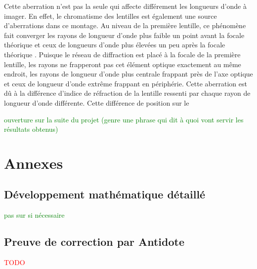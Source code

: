 \documentclass[conference]{IEEEtran}
\begin{document}
Cette aberration n'est pas la seule qui affecte différement les longueurs d'onde à imager. En effet, le chromatisme des lentilles
est également une source d'aberrations dans ce montage. Au niveau de la première lentille, ce phénomène fait converger les rayons 
de longueur d'onde plus faible un point avant la focale théorique et ceux de longueurs d'onde plus élevées un peu après la focale
théorique \cite{wikipedia_aberration_chromatique}. Puisque le réseau de diffraction est placé à la focale de la première lentille, les rayons ne
frapperont pas cet élément optique exactement au même endroit, les rayons de longueur d'onde plus centrale frappant près de l'axe
optique et ceux de longueur d'onde extrême frappant en périphérie. Cette aberration est dû à la différence d'indice de réfraction 
de la lentille ressenti par chaque rayon de longueur d'onde différente\cite{wikipedia_aberration_chromatique}. Cette différence de position sur le 

\textcolor{green}{ouverture sur la suite du projet (genre une phrase qui dit à quoi vont servir les résultats obtenus)}

\printbibliography

\clearpage

\section{Annexes}

\subsection{Développement mathématique détaillé}
\textcolor{green}{pas sur si nécessaire}

\subsection{Preuve de correction par Antidote}
\textcolor{red}{TODO}


\clearpage
\end{document}
